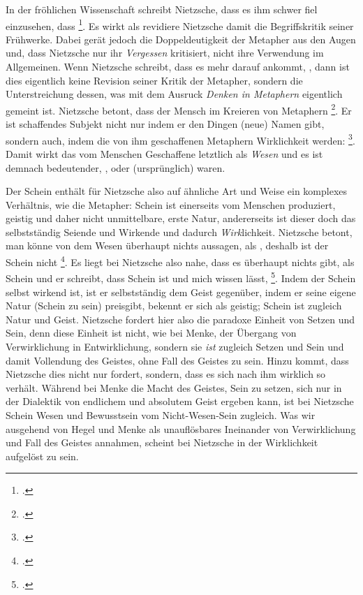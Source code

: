 \documentclass[12pt, a4paper, openany]{report}
\begin{document}
In der fröhlichen Wissenschaft schreibt Nietzsche, dass es ihm schwer fiel einzusehen, dass \footcite[][422]{nietzsche_morgenrote_1999}.
Es wirkt als revidiere Nietzsche damit die Begriffskritik seiner Frühwerke.
Dabei gerät jedoch die Doppeldeutigkeit der Metapher aus den Augen und, dass Nietzsche nur ihr \emph{Vergessen} kritisiert, nicht ihre Verwendung im Allgemeinen. 
Wenn Nietzsche schreibt, dass es mehr darauf ankommt, , dann ist dies eigentlich keine Revision seiner Kritik der Metapher, sondern die Unterstreichung dessen, was mit dem Ausruck \emph{Denken in Metaphern} eigentlich gemeint ist.
Nietzsche betont, dass der Mensch im Kreieren von Metaphern \footcite[][883]{nietzsche_geburt_1999}.
Er ist schaffendes Subjekt nicht nur indem er den Dingen (neue) Namen gibt, sondern auch, indem die von ihm geschaffenen Metaphern Wirklichkeit werden: 
\footcite[][422]{nietzsche_morgenrote_1999}.
Damit wirkt das vom Menschen Geschaffene letztlich als \emph{Wesen} und es ist demnach bedeutender, , oder (ursprünglich) waren.

Der Schein enthält für Nietzsche also auf ähnliche Art und Weise ein komplexes Verhältnis, wie die Metapher: 
Schein ist einerseits vom Menschen produziert, geistig und daher nicht unmittelbare, erste Natur, andererseits ist dieser doch das selbstständig Seiende und Wirkende und dadurch \emph{Wirk}lichkeit.
Nietzsche betont, man könne von dem Wesen überhaupt nichts aussagen, als , deshalb ist der Schein nicht \footcite[][417]{nietzsche_geburt_1999}.
Es liegt bei Nietzsche also nahe, dass es überhaupt nichts gibt, als Schein und er schreibt, dass Schein  ist und mich wissen lässt, \footcite[][417]{nietzsche_morgenrote_1999}.
Indem der Schein selbst wirkend ist, ist er selbstständig dem Geist gegenüber, indem er seine eigene Natur (Schein zu sein) preisgibt, bekennt er sich als geistig;
Schein ist zugleich Natur und Geist.
Nietzsche fordert hier also die paradoxe Einheit von Setzen und Sein, denn diese Einheit ist nicht, wie bei Menke, der Übergang von Verwirklichung in Entwirklichung, sondern sie \emph{ist} zugleich Setzen und Sein und damit Vollendung des Geistes, ohne Fall des Geistes zu sein.
Hinzu kommt, dass Nietzsche dies nicht nur fordert, sondern, dass es sich nach ihm wirklich so verhält.
Während bei Menke die Macht des Geistes, Sein zu setzen, sich nur in der Dialektik von endlichem und absolutem Geist ergeben kann,
ist bei Nietzsche Schein Wesen und Bewusstsein vom Nicht-Wesen-Sein zugleich.
Was wir ausgehend von Hegel und Menke als unauflösbares Ineinander von Verwirklichung und Fall des Geistes annahmen, scheint bei Nietzsche in der Wirklichkeit aufgelöst zu sein. \\
\end{document}
